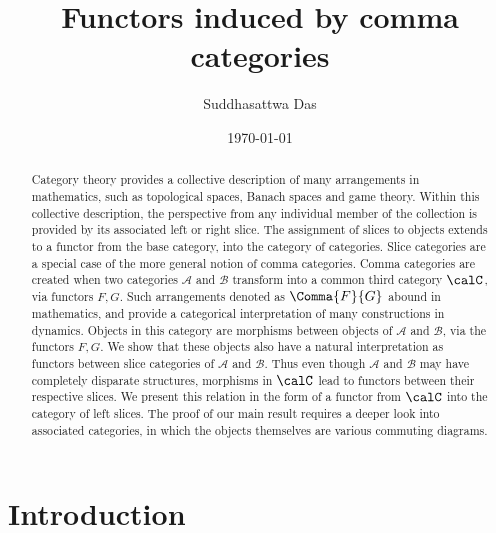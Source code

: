 \documentclass[12pt,oneside]{article}
\title{Functors induced by comma categories}
\begin{document}
\author{ Suddhasattwa Das \footnotemark[1] }
\date{\today}
\maketitle
\begin{abstract}
	Category theory provides a collective description of many arrangements in mathematics, such as topological spaces, Banach spaces and game theory. Within this collective description, the perspective from any individual member of the collection is provided by its associated left or right slice. The assignment of slices to objects extends to a functor from the base category, into the category of categories. Slice categories are a special case of the more general notion of comma categories. Comma categories are created when two categories $\mathcal{A}$ and $\mathcal{B}$ transform into a common third category $\calC$, via functors $F,G$. Such arrangements denoted as $\Comma{F}{G}$ abound in mathematics, and provide a categorical interpretation of many constructions in dynamics. Objects in this category are morphisms between objects of $\mathcal{A}$ and $\mathcal{B}$, via the functors $F,G$. We show that these objects also have a natural interpretation as functors between slice categories of $\mathcal{A}$ and $\mathcal{B}$. Thus even though $\mathcal{A}$ and $\mathcal{B}$ may have completely disparate structures, morphisms in $\calC$ lead to functors between their respective slices. We present this relation in the form of a functor from $\calC$ into the category of left slices. The proof of our main result requires a deeper look into associated categories, in which the objects themselves are various commuting diagrams.
\end{abstract}
\section{Introduction}
\end{document}
